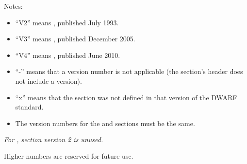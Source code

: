 Notes:

\begin{itemize}
\item  ``V2'' means , published July 1993.
\item  ``V3'' means , published December 2005.
\item  ``V4'' means , published June 2010.
\item  ``-'' means that a version number is not applicable
(the section's header does not include a version).

\item  ``x'' means that the section was not defined in that
version of the DWARF standard.

\item  The version numbers for the \dotdebuginfo{} and \dotdebugtypes{}
sections must be the same.

\end{itemize}

\textit{For \dotdebugframe{}, section version 2 is unused.}

Higher numbers are reserved for future use.

